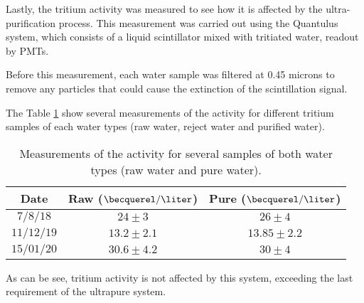 Lastly, the tritium activity was measured to see how it is affected by the ultra-purification process. This measurement was carried out using the Quantulus system, which consists of a liquid scintillator mixed with tritiated water, readout by PMTs. 

Before this measurement, each water sample was filtered at 0.45 microns to remove any particles that could cause the extinction of the scintillation signal.

The Table \ref{tab:ActivityTritiumValues} show several measurements of the activity for different tritium samples of each water types (raw water, reject water and purified water).

\begin{table}[htbp]
\begin{center}
\begin{tabular}{|c|c|c|}
\hline
Date & Raw ($\becquerel/\liter$) & Pure ($\becquerel/\liter$) \\
\hline \hline \hline
$7/8/18$ & $24 \pm 3$ & $26 \pm 4$ \\ \hline
$11/12/19$ & $13.2 \pm 2.1$ & $13.85 \pm 2.2$ \\ \hline
$15/01/20$ & $30.6 \pm 4.2$ & $30 \pm 4$ \\ \hline
\end{tabular}
\caption{Measurements of the activity for several samples of both water types (raw water and pure water).}
\label{tab:ActivityTritiumValues}
\end{center}
\end{table}	

As can be see, tritium activity is not affected by this system, exceeding the last requirement of the ultrapure system. 